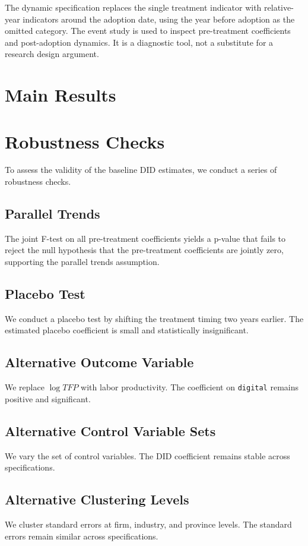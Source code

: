 \documentclass[11pt]{article}
\begin{document}
The dynamic specification replaces the single treatment indicator with relative-year indicators around the adoption date, using the year before adoption as the omitted category. The event study is used to inspect pre-treatment coefficients and post-adoption dynamics. It is a diagnostic tool, not a substitute for a research design argument.

\section{Main Results}
\section{Robustness Checks}

To assess the validity of the baseline DID estimates, we conduct a series of robustness checks.

\subsection{Parallel Trends}
The joint F-test on all pre-treatment coefficients yields a p-value that fails to reject the null hypothesis that the pre-treatment coefficients are jointly zero, supporting the parallel trends assumption.

\subsection{Placebo Test}
We conduct a placebo test by shifting the treatment timing two years earlier. The estimated placebo coefficient is small and statistically insignificant.

\subsection{Alternative Outcome Variable}
We replace $\log TFP$ with labor productivity. The coefficient on \texttt{digital} remains positive and significant.

\subsection{Alternative Control Variable Sets}
We vary the set of control variables. The DID coefficient remains stable across specifications.

\subsection{Alternative Clustering Levels}
We cluster standard errors at firm, industry, and province levels. The standard errors remain similar across specifications.
\end{document}
